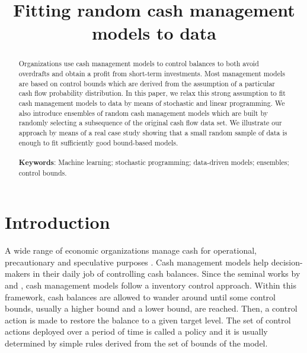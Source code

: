 
\title{Fitting random cash management models to data}
\maketitle

\begin{abstract}
Organizations use cash management models to control balances to both avoid overdrafts and obtain a profit from short-term investments. Most management models are based on control bounds which are derived from the assumption of a particular cash flow probability distribution. In this paper, we relax this strong assumption to fit cash management models to data by means of stochastic and linear programming. We also introduce ensembles of random cash management models which are built by randomly selecting a subsequence of the original cash flow data set. We illustrate our approach by means of a real case study showing that a small random sample of data is enough to fit sufficiently good bound-based models.
\\
\\

\noindent
\textbf{Keywords}: Machine learning; stochastic programming; data-driven models; ensembles; control bounds.
\\
\end{abstract}




\section{Introduction\label{intro}}

A wide range of economic organizations manage cash for operational, precautionary and speculative purposes \citep{keynes1936general}. Cash management models help decision-makers in their daily job of controlling cash balances. Since the seminal works by \cite{baumol1952transactions} and \cite{miller1966model}, cash management models follow a inventory control approach. Within this framework, cash balances are allowed to wander around until some control bounds, usually a higher bound and a lower bound, are reached. Then, a control action is made to restore the balance to a given target level. The set of control actions deployed over a period of time is called a policy and it is usually determined by simple rules derived from the set of bounds of the model. 

